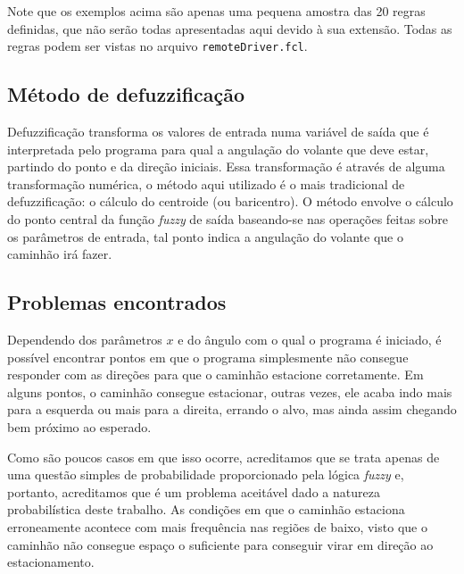 \documentclass{article}
\begin{document}
        Note que os exemplos acima são apenas uma pequena amostra das 20 regras
        definidas, que não serão todas apresentadas aqui devido à sua extensão.
        Todas as regras podem ser vistas no arquivo \texttt{remoteDriver.fcl}.

    \subsection*{Método de defuzzificação}
        Defuzzificação transforma os valores de entrada numa variável de saída
        que é interpretada pelo programa para qual a angulação do volante que
        deve estar, partindo do ponto e da direção iniciais. Essa transformação
        é através de alguma transformação numérica, o método aqui utilizado é o
        mais tradicional de defuzzificação: o cálculo do centroide (ou
        baricentro). O método envolve o cálculo do ponto central da função
        \textit{fuzzy} de saída baseando-se nas operações feitas sobre os
        parâmetros de entrada, tal ponto indica a angulação do volante que o
        caminhão irá fazer.
        
    \subsection*{Problemas encontrados}
        Dependendo dos parâmetros $x$ e do ângulo com o qual o programa é
        iniciado, é possível encontrar pontos em que o programa simplesmente
        não consegue responder com as direções para que o caminhão estacione
        corretamente. Em alguns pontos, o caminhão consegue estacionar, outras
        vezes, ele acaba indo mais para a esquerda ou mais para a direita,
        errando o alvo, mas ainda assim chegando bem próximo ao esperado. 
        
        Como são poucos casos em que isso ocorre, acreditamos que se trata
        apenas de uma questão simples de probabilidade proporcionado pela
        lógica \textit{fuzzy} e, portanto, acreditamos que é um problema
        aceitável dado a natureza probabilística deste trabalho. As condições
        em que o caminhão estaciona erroneamente acontece com mais frequência
        nas regiões de baixo, visto que o caminhão não consegue espaço o
        suficiente para conseguir virar em direção ao estacionamento.
        
\end{document}
